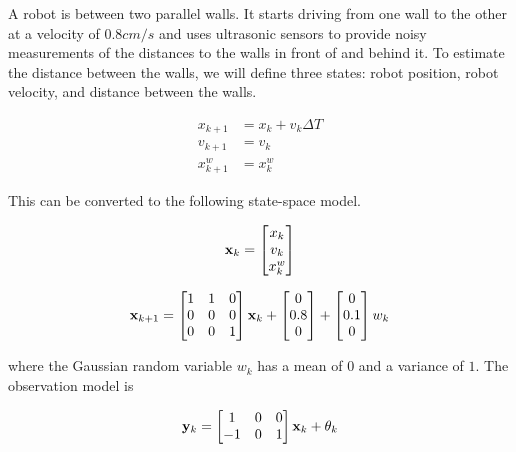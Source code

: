 A robot is between two parallel walls. It starts driving from one wall to the
other at a velocity of $0.8 cm/s$ and uses ultrasonic sensors to provide noisy
measurements of the distances to the walls in front of and behind it. To
estimate the distance between the walls, we will define three \glspl{state}:
robot position, robot velocity, and distance between the walls.

\begin{align}
  x_{k+1} &= x_k + v_k \Delta T \\
  v_{k+1} &= v_k \\
  x_{k+1}^w &= x_k^w
\end{align}

This can be converted to the following state-space \gls{model}.

\begin{equation}
  \mathbf{x}_k =
  \begin{bmatrix}
    x_k \\
    v_k \\
    x_k^w
  \end{bmatrix}
\end{equation}

\begin{equation}
  \mathbf{x}_{k+1} =
  \begin{bmatrix}
    1 & 1 & 0 \\
    0 & 0 & 0 \\
    0 & 0 & 1
  \end{bmatrix} \mathbf{x}_k +
  \begin{bmatrix}
    0 \\
    0.8 \\
    0
  \end{bmatrix} +
  \begin{bmatrix}
    0 \\
    0.1 \\
    0
  \end{bmatrix} w_k
\end{equation}

where the Gaussian random variable $w_k$ has a mean of $0$ and a variance of
$1$. The observation \gls{model} is

\begin{equation}
  \mathbf{y}_k =
  \begin{bmatrix}
    1 & 0 & 0 \\
    -1 & 0 & 1
  \end{bmatrix} \mathbf{x}_k + \theta_k
\end{equation}

